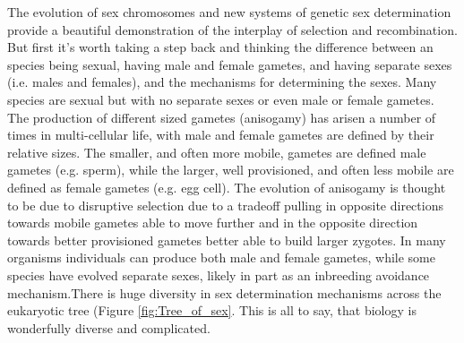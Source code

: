The evolution of sex chromosomes and new systems of genetic sex determination provide a beautiful demonstration of the interplay of selection and recombination. But first it's worth taking a step back and thinking the difference between an species being sexual, having male and female gametes, and having separate sexes (i.e. males and females), and the mechanisms for determining the sexes. Many species are sexual but with no separate sexes or even male or female gametes. The production of different sized gametes (anisogamy) has arisen a number of times in multi-cellular life, with male and female gametes are defined by their relative sizes. The smaller, and often more mobile, gametes are defined male gametes  (e.g. sperm), while the larger, well provisioned, and often less mobile are defined as female gametes (e.g. egg cell). The evolution of anisogamy is thought to be due to disruptive selection due to a tradeoff pulling in opposite directions towards mobile gametes able to move further and in the opposite direction towards better provisioned gametes better able to build larger zygotes. In many organisms individuals can produce both male and female gametes, while some species have evolved separate sexes, likely in part as an inbreeding avoidance mechanism.There is huge diversity in sex determination mechanisms across the eukaryotic tree (Figure \ref{fig:Tree_of_sex}. This is all to say, that biology is wonderfully diverse and complicated.
